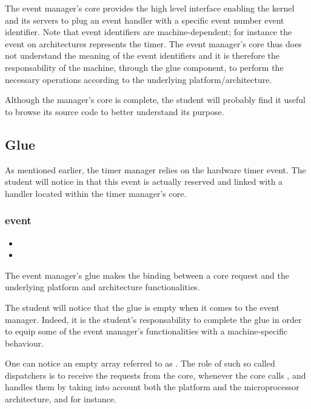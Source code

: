 The event manager's core provides the high level interface enabling the kernel
and its servers to plug an event handler with a specific event number \ie{}
event identifier. Note that event identifiers are machine-dependent; for
instance the event  on  architectures represents the
timer. The event manager's core thus does not understand the meaning of the
event identifiers and it is therefore the responsability of the machine,
through the glue component, to perform the necessary operations according
to the underlying platform/architecture.

Although the manager's core is complete, the student will probably find it
useful to browse its source code to better understand its purpose.

\subsection{Glue}

As mentioned earlier, the timer manager relies on the hardware timer event.
The student will notice in
 that this
event is actually reserved and linked with a handler located within the
timer manager's core.

\subsubsection*{event}

\begin{itemize}
  \item
  \item
\end{itemize}

The event manager's glue makes the binding between a core request and the
underlying platform and architecture functionalities.

The student will notice that the glue is empty when it comes to the
event manager. Indeed, it is the student's responsability to complete the
glue in order to equip some of the event manager's functionalities with a
machine-specific behaviour.

One can notice an empty array referred to as .
The role of such so called dispatchers is to receive the requests from
the core, \ie{} whenever the core calls , and
handles them by taking into account both the platform and the microprocessor
architecture,  and  for instance.

